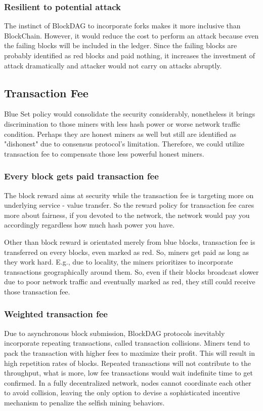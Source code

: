 \documentclass[a4paper,11pt]{article}
\begin{document}
\subsubsection*{Resilient to potential attack}
The instinct of BlockDAG to incorporate forks makes it more inclusive than BlockChain. However, it would reduce the cost to perform an attack because even the failing blocks will be included in the ledger. Since the failing blocks are probably identified as red blocks and paid nothing, it increases the investment of attack dramatically and attacker would not carry on attacks abruptly.

\subsection{Transaction Fee}
Blue Set policy would consolidate the security considerably, nonetheless it brings discrimination to those miners with less hash power or worse network traffic condition. Perhaps they are honest miners as well but still are identified as "dishonest" due to consensus protocol's limitation. Therefore, we could utilize transaction fee to compensate those less powerful honest miners. 

\subsubsection{Every block gets paid transaction fee}
The block reward aims at security while the transaction fee is targeting more on underlying service - value transfer. So the reward policy for transaction fee cares more about fairness, if you devoted to the network, the network would pay you accordingly regardless how much hash power you have.

Other than block reward is orientated merely from  blue blocks, transaction fee is transferred on every blocks, even marked as red. So, miners get paid as long as they work hard. E.g., due to locality, the miners prioritizes to incorporate transactions geographically around them. So, even if their blocks broadcast slower due to poor network traffic and eventually marked as red, they still could receive those transaction fee.

\subsubsection{Weighted transaction fee}
Due to asynchronous block submission, BlockDAG protocols inevitably incorporate repeating transactions, called transaction collisions.
Miners tend to pack the transaction with higher fees to maximize their profit. This will result in high repetition rates of blocks. Repeated transactions will not contribute to the throughput, what is more, low fee transactions would wait indefinite time to get confirmed. In a fully decentralized network, nodes cannot coordinate each other to avoid collision, leaving the only option to devise a sophisticated incentive mechanism to penalize the selfish mining behaviors.
\end{document}
